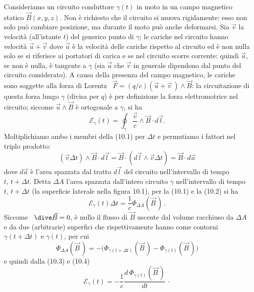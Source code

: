 Consideriamo un circuito conduttore $\gamma(t)$ in moto in un campo magnetico
statico $\vec B(x,y,z)$. Non \`e richiesto che il circuito si muova rigidamente:
esso non solo pu\`o cambiare posizione, ma durante il moto pu\`o anche
deformarsi. Sia $\vec v$ la velocit\`a (all'istante $t$) del generico punto di
$\gamma$; le cariche nel circuito hanno velocit\`a $\vec u+\vec v$ dove $\vec u$
\`e la velocit\`a delle cariche rispetto al circuito ed \`e non nulla solo se si
riferisce ai portatori di carica e se nel circuito scorre corrente: quindi
$\vec u$, se non \`e nulla, \`e tangente a $\gamma$ (sia $\vec u$ che $\vec v$
in generale dipendono dal punto del circuito considerato).
A causa della presenza del campo magnetico, le cariche sono soggette alla forza
di Lorentz \ $\vec F=(q/c)(\vec u+\vec v\,)\wedge\vec B$: la circuitazione di
questa forza lungo $\gamma$ (divisa per $q$) \`e per definizione la forza
elettromotrice nel circuito; siccome $\vec u\wedge\vec B$ \`e ortogonale a
$\gamma$, si ha
\begin{equation}
  \mathcal E_\gamma(t)=\oint_\gamma\frac{\vec v}{c}\wedge\vec B\cdot d\vec l.
  \tag{10.1}
\end{equation}
Moltiplichiamo ambo i membri della (10.1) per $\Delta t$ e permutiamo i fattori
nel triplo prodotto:
\begin{equation}
  (\vec v\Delta t)\wedge\vec B\cdot d\vec l
  =\vec B\cdot(d\vec l\wedge\vec v\Delta t)=\vec B\cdot d\vec a
  \tag{10.2}
\end{equation}
dove $d\vec a$ \`e l'area spazzata dal tratto $d\vec l$ del circuito
nell'intervallo di tempo $t,\,t+\Delta t$. Detta $\Delta A$ l'area spazzata
dall'intero circuito $\gamma$ nell'intervallo di tempo $t,\,t+\Delta t$ (la
superficie laterale nella figura 10.1), per la (10.1) e la (10.2) si ha
\begin{equation}
  \mathcal E_\gamma(t)\Delta t=\frac{1}{c}\Phi_{\Delta A}(\vec B\,)\,.
  \tag{10.3}
\end{equation}
Siccome \ $\dive\vec B=0$, \`e nullo il flusso di $\vec B$ uscente dal volume
racchiuso da $\Delta A$ e da due (arbitrarie) superfici che rispettivamente
hanno come contorni $\gamma(t+\Delta t)$ e $\gamma(t)$, per cui
\begin{equation}
  \Phi_{\Delta A}(\vec B\,)
  =-\Big(\Phi_{\gamma(t+\Delta t)}(\vec B\,)-\Phi_{\gamma(t)}(\vec B\,)\Big)
  \tag{10.4}
\end{equation}
e quindi dalla (10.3) e (10.4)
\begin{equation}
  \mathcal E_\gamma(t)
  =-\frac{1}{c}\frac{d\,\Phi_{\gamma(t)}(\vec B\,)}{dt}\,\cdot
  \tag{10.5}
\end{equation}
